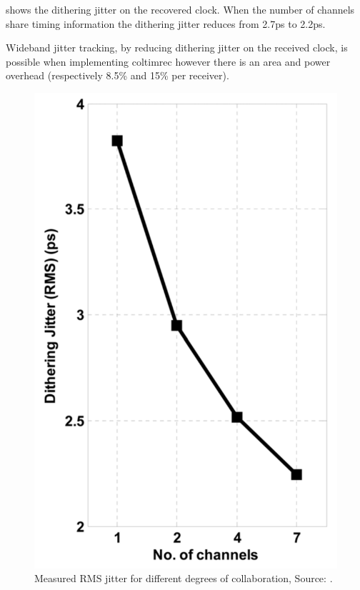  shows the dithering jitter on the recovered clock. 
When the number of channels share timing information the dithering jitter reduces from 2.7ps to 2.2ps.

Wideband jitter tracking, by reducing dithering jitter on the received clock, is possible when implementing \ac{coltimrec} however there is an area and power overhead (respectively 8.5\% and 15\% per receiver).

\begin{figure}	\centering
	
	\includegraphics[width=0.7\linewidth]{Figures/Rep1Result.png}
	\caption{Measured RMS jitter for different degrees of collaboration, Source: \cite{agrawal20098}.} 
    \label{fig:rep1:result}
\end{figure}


